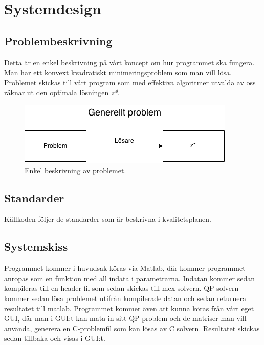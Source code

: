 \section{Systemdesign}


\subsection{Problembeskrivning}
Detta är en enkel beskrivning på vårt koncept om hur programmet ska fungera. Man har ett konvext kvadratiskt minimeringsproblem som man vill lösa. Problemet skickas till vårt program som med effektiva algoritmer utvalda av oss räknar ut den optimala lösningen \textit{z*}.

\begin{figure}[h]
	\begin{center}
		\includegraphics[scale=0.7]{bilder/Generellt.png}
	\end{center}
	\caption{Enkel beskrivning av problemet.}
\end{figure}

\subsection{Standarder}
Källkoden följer de standarder som är beskrivna i kvalitetsplanen.

\subsection{Systemskiss}
Programmet kommer i huvudsak köras via Matlab, där kommer programmet anropas som en funktion med all indata i parametrarna. Indatan kommer sedan kompileras till en header fil som sedan skickas till mex solvern. QP-solvern kommer sedan lösa problemet utifrån kompilerade datan och sedan returnera resultatet till matlab. Programmet kommer även att kunna köras från vårt eget GUI, där man i GUI:t kan mata in sitt QP problem och de matriser man vill använda, generera en C-problemfil som kan lösas av C solvern. Resultatet skickas sedan tillbaka och visas i GUI:t.

